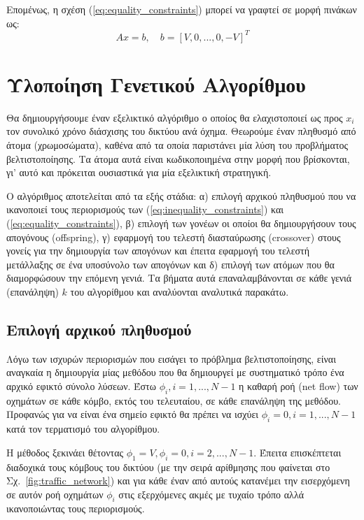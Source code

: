 \documentclass[a4paper,12pt]{article}
\begin{document}
Επομένως, η σχέση (\ref{eq:equality_constraints}) μπορεί να γραφτεί σε μορφή πινάκων ως:
\begin{equation}
    A x = b, \quad b = [V,0,...,0,-V]^T
    \label{eq:equality_constraints_matrix_form}
\end{equation}

\newpage

\section{Υλοποίηση Γενετικού Αλγορίθμου}

Θα δημιουργήσουμε έναν εξελικτικό αλγόριθμο ο οποίος θα ελαχιστοποιεί ως προς $x_i$ τον συνολικό χρόνο διάσχισης 
του δικτύου ανά όχημα. Θεωρούμε έναν πληθυσμό από άτομα (χρωμοσώματα), καθένα από τα οποία παριστάνει μία λύση του
προβλήματος βελτιστοποίησης. Τα άτομα αυτά είναι κωδικοποιημένα στην μορφή που βρίσκονται, γι' αυτό και πρόκειται 
ουσιαστικά για μία εξελικτική στρατηγική. 

Ο αλγόριθμος αποτελείται από τα εξής στάδια: 
α) επιλογή αρχικού πληθυσμού που να ικανοποιεί τους περιορισμούς των (\ref{eq:inequality_constraints}) και 
(\ref{eq:equality_constraints}),
β) επιλογή των γονέων οι οποίοι θα δημιουργήσουν τους απογόνους
(offspring),
γ) εφαρμογή του τελεστή διασταύρωσης (crossover) στους γονείς 
για την δημιουργία των απογόνων και έπειτα εφαρμογή του τελεστή μετάλλαξης σε ένα υποσύνολο των απογόνων και
δ) επιλογή των ατόμων που θα διαμορφώσουν την επόμενη γενιά. 
Τα βήματα αυτά επαναλαμβάνονται σε κάθε γενιά (επανάληψη) $k$ του αλγορίθμου και αναλύονται αναλυτικά παρακάτω.

\subsection{Επιλογή αρχικού πληθυσμού}
Λόγω των ισχυρών περιορισμών που εισάγει το πρόβλημα βελτιστοποίησης, είναι αναγκαία η δημιουργία μίας μεθόδου
που θα δημιουργεί με συστηματικό τρόπο ένα αρχικό εφικτό σύνολο λύσεων. Έστω $\phi_i, i=1,...,N-1$ η καθαρή ροή 
(net flow) των οχημάτων σε κάθε κόμβο, εκτός του τελευταίου, 
σε κάθε επανάληψη της μεθόδου. Προφανώς για να είναι ένα σημείο εφικτό θα πρέπει να ισχύει $\phi_i = 0, i=1,...,N-1$ 
κατά τον τερματισμό του αλγορίθμου.

Η μέθοδος ξεκινάει θέτοντας $\phi_1 = V, \phi_i = 0, i=2,...,N-1$. Έπειτα επισκέπτεται διαδοχικά 
τους κόμβους του δικτύου (με την σειρά αρίθμησης που φαίνεται στο Σχ.~\ref{fig:traffic_network}) και για κάθε έναν
από αυτούς κατανέμει την εισερχόμενη σε αυτόν ροή οχημάτων $\phi_i$ στις εξερχόμενες ακμές με τυχαίο τρόπο αλλά 
ικανοποιώντας τους περιορισμούς. 
\end{document}
